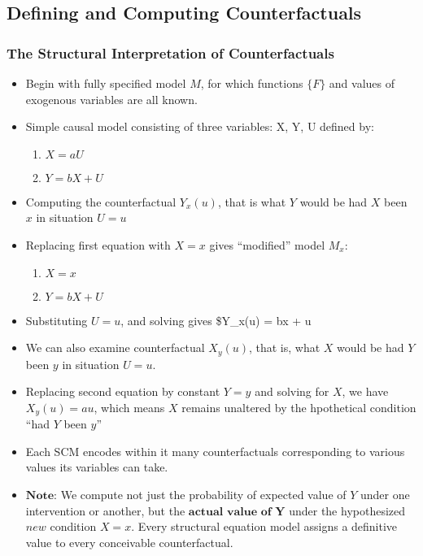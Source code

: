 \documentclass[]{article}
\providecommand{\tightlist}{%
  \setlength{\itemsep}{0pt}\setlength{\parskip}{0pt}}
\begin{document}
\subsection{Defining and Computing
Counterfactuals}\label{defining-and-computing-counterfactuals}

\subsubsection{The Structural Interpretation of
Counterfactuals}\label{the-structural-interpretation-of-counterfactuals}

\begin{itemize}
\item
  Begin with fully specified model \(M\), for which functions \(\{F\}\)
  and values of exogenous variables are all known.
\item
  Simple causal model consisting of three variables: X, Y, U defined by:

  \begin{enumerate}
  \def\labelenumi{\arabic{enumi}.}
  \tightlist
  \item
    \(X = aU\)
  \item
    \(Y = bX + U\)
  \end{enumerate}
\item
  Computing the counterfactual \(Y_x(u)\), that is what \(Y\) would be
  had \(X\) been \(x\) in situation \(U = u\)
\item
  Replacing first equation with \(X = x\) gives ``modified'' model
  \(M_x\):

  \begin{enumerate}
  \def\labelenumi{\arabic{enumi}.}
  \tightlist
  \item
    \(X = x\)
  \item
    \(Y = bX + U\)
  \end{enumerate}
\item
  Substituting \(U = u\), and solving gives \$Y\_x(u) = bx + u
\item
  We can also examine counterfactual \(X_y(u)\), that is, what \(X\)
  would be had \(Y\) been \(y\) in situation \(U = u\).
\item
  Replacing second equation by constant \(Y = y\) and solving for \(X\),
  we have \(X_y(u) = au\), which means \(X\) remains unaltered by the
  hpothetical condition ``had \(Y\) been \(y\)''
\item
  Each SCM encodes within it many counterfactuals corresponding to
  various values its variables can take.
\item
  \(\textbf{Note}\): We compute not just the probability of expected
  value of \(Y\) under one intervention or another, but the
  \(\textbf{actual value of Y}\) under the hypothesized \(\textit{new}\)
  condition \(X = x\). Every structural equation model assigns a
  definitive value to every conceivable counterfactual.
\end{itemize}
\end{document}
